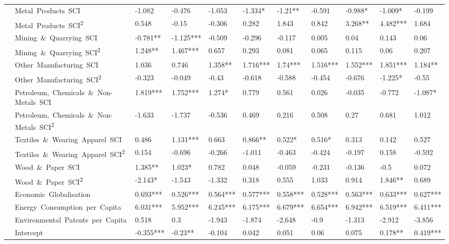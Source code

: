 \documentclass[10pt]{article}
\begin{document}
\begin{table}[H]
\begin{adjustbox}{width=\textwidth,center}
\begin{tabular}{lllllllllll}
      & Metal\ Products\ SCI & -1.082 & -0.476 & -1.053 & -1.334* & -1.21** & -0.591 & -0.988* & -1.009* & -0.199 \\
      & Metal\ Products\ SCI\textsuperscript{2} & 0.548 & -0.15 & -0.306 & 0.282 & 1.843 & 0.842 & 3.268** & 4.482*** & 1.684 \\
      & Mining\ \&\ Quarrying\ SCI & -0.781** & -1.125*** & -0.509 & -0.296 & -0.117 & 0.005 & 0.04 & 0.143 & 0.06 \\
      & Mining\ \&\ Quarrying\ SCI\textsuperscript{2} & 1.248** & 1.467*** & 0.657 & 0.293 & 0.081 & 0.065 & 0.115 & 0.06 & 0.207 \\
      & Other\ Manufacturing\ SCI & 1.036 & 0.746 & 1.358** & 1.716*** & 1.74*** & 1.516*** & 1.552*** & 1.851*** & 1.184** \\
      & Other\ Manufacturing\ SCI\textsuperscript{2} & -0.323 & -0.049 & -0.43 & -0.618 & -0.588 & -0.454 & -0.676 & -1.225* & -0.55 \\
      & Petroleum,\ Chemicals\ \&\ Non-Metals\ SCI & 1.819*** & 1.752*** & 1.274* & 0.779 & 0.561 & 0.026 & -0.035 & -0.772 & -1.087* \\
      & Petroleum,\ Chemicals\ \&\ Non-Metals\ SCI\textsuperscript{2} & -1.633 & -1.737 & -0.536 & 0.469 & 0.216 & 0.508 & 0.27 & 0.681 & 1.012 \\
      & Textiles\ \&\ Wearing\ Apparel\ SCI & 0.486 & 1.131*** & 0.663 & 0.866** & 0.522* & 0.516* & 0.313 & 0.142 & 0.527 \\
      & Textiles\ \&\ Wearing\ Apparel\ SCI\textsuperscript{2} & 0.154 & -0.696 & -0.266 & -1.011 & -0.463 & -0.424 & -0.197 & 0.158 & -0.592 \\
      & Wood\ \&\ Paper\ SCI & 1.385** & 1.023* & 0.782 & 0.048 & -0.059 & -0.231 & -0.136 & -0.5 & 0.072 \\
      & Wood\ \&\ Paper\ SCI\textsuperscript{2} & -2.143* & -1.543 & -1.332 & 0.318 & 0.555 & 1.033 & 0.914 & 1.846** & 0.689 \\
      & Economic\ Globalisation & 0.693*** & 0.526*** & 0.564*** & 0.577*** & 0.558*** & 0.528*** & 0.563*** & 0.633*** & 0.627*** \\
      & Energy\ Consumption\ per\ Capita & 6.031*** & 5.952*** & 6.245*** & 6.175*** & 6.679*** & 6.654*** & 6.942*** & 6.519*** & 6.411*** \\
      & Environmental\ Patents\ per\ Capita & 0.518 & 0.3 & -1.943 & -1.874 & -2.648 & -0.9 & -1.313 & -2.912 & -3.856 \\
      & Intercept & -0.355*** & -0.23** & -0.104 & 0.042 & 0.051 & 0.06 & 0.075 & 0.178** & 0.419*** \\

\end{tabular}
\end{adjustbox}
\end{table}
\end{document}
